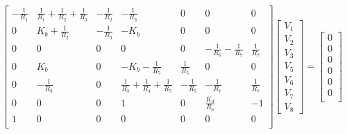 \[
  \begin{bmatrix}
    - \frac{1}{R_1} & \frac{1}{R_1} + \frac{1}{R_2} + \frac{1}{R_3} & -\frac{1}{R_2} & -\frac{1}{R_3}                                & 0              & 0                              & 0             \\
    0               & K_b + \frac{1}{R_2}                           & -\frac{1}{R_3} & - K_b                                         & 0              & 0                              & 0             \\
    0               & 0                                             & 0              & 0                                             & 0              & -\frac{1}{R_6} - \frac{1}{R_7} & \frac{1}{R_7} \\
    0               & K_b                                           & 0              & -K_b - \frac{1}{R_5}                          & \frac{1}{R_5}  & 0                              & 0             \\
    0               & -\frac{1}{R_3}                                & 0              & \frac{1}{R_3} + \frac{1}{R_4} + \frac{1}{R_5} & -\frac{1}{R_5} & -\frac{1}{R_7}                 & \frac{1}{R_7} \\
    0               & 0                                             & 0              & 1                                             & 0              & \frac{K_d}{R_6}                & -1            \\
    1               & 0                                             & 0              & 0                                             & 0              & 0                              & 0             \\
  \end{bmatrix}
  \begin{bmatrix}
    V_1 \\ V_2 \\ V_3 \\ V_5 \\ V_6 \\ V_7 \\ V_8
  \end{bmatrix}
  =
  \begin{bmatrix}
    0 \\ 0 \\ 0 \\ 0 \\ 0  \\ 0 \\
  \end{bmatrix}
\]


